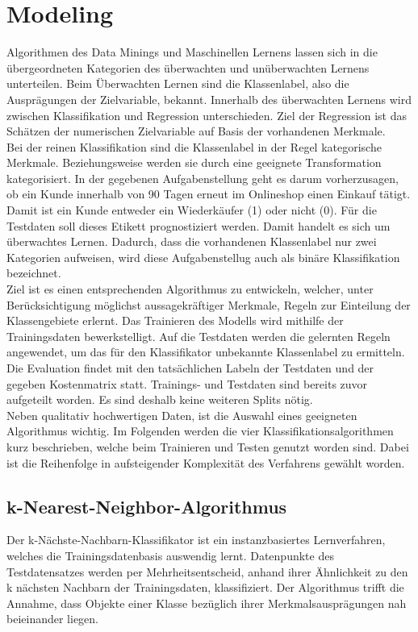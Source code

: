 \section{Modeling}

Algorithmen des Data Minings und Maschinellen Lernens lassen sich in die übergeordneten Kategorien des überwachten und unüberwachten Lernens unterteilen. Beim Überwachten Lernen sind die Klassenlabel, also die Ausprägungen der Zielvariable, bekannt. Innerhalb des überwachten Lernens wird zwischen Klassifikation und Regression unterschieden. Ziel der Regression ist das Schätzen der numerischen Zielvariable auf Basis der vorhandenen Merkmale.\\

Bei der reinen Klassifikation sind die Klassenlabel in der Regel kategorische Merkmale. Beziehungsweise werden sie durch eine geeignete Transformation kategorisiert. In der gegebenen Aufgabenstellung geht es darum vorherzusagen, ob ein Kunde innerhalb von 90 Tagen erneut im Onlineshop einen Einkauf tätigt. Damit ist ein Kunde entweder ein Wiederkäufer (1) oder nicht (0). Für die Testdaten soll dieses Etikett prognostiziert werden. Damit handelt es sich um überwachtes Lernen. Dadurch, dass die vorhandenen Klassenlabel nur zwei Kategorien aufweisen, wird diese Aufgabenstellug auch als binäre Klassifikation bezeichnet.\\

Ziel ist es einen entsprechenden Algorithmus zu entwickeln, welcher, unter Berücksichtigung möglichst aussagekräftiger Merkmale, Regeln zur Einteilung der Klassengebiete erlernt. Das Trainieren des Modells wird mithilfe der Trainingsdaten bewerkstelligt. Auf die Testdaten werden die gelernten Regeln angewendet, um das für den Klassifikator unbekannte Klassenlabel zu ermitteln. Die Evaluation findet mit den tatsächlichen Labeln der Testdaten und der gegeben Kostenmatrix statt. Trainings- und Testdaten sind bereits zuvor aufgeteilt worden. Es sind deshalb keine weiteren Splits nötig.\\

Neben qualitativ hochwertigen Daten, ist die Auswahl eines geeigneten Algorithmus wichtig. Im Folgenden werden die vier Klassifikationsalgorithmen kurz beschrieben, welche beim Trainieren und Testen genutzt worden sind. Dabei ist die Reihenfolge in aufsteigender Komplexität des Verfahrens gewählt worden. 

\subsection{k-Nearest-Neighbor-Algorithmus}
\label{sec:kNN}
Der k-Nächste-Nachbarn-Klassifikator ist ein instanzbasiertes Lernverfahren, welches die Trainingsdatenbasis auswendig lernt. Datenpunkte des Testdatensatzes werden per Mehrheitsentscheid, anhand ihrer Ähnlichkeit zu den k nächsten Nachbarn der Trainingsdaten, klassifiziert. Der Algorithmus trifft die Annahme, dass Objekte einer Klasse bezüglich ihrer Merkmalsausprägungen nah beieinander liegen.\\

